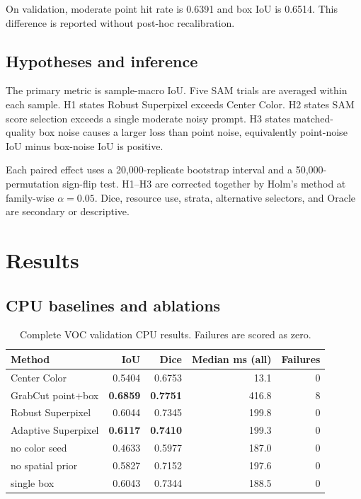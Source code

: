 On validation, moderate point hit rate is 0.6391 and box IoU is 0.6514. This difference is reported without post-hoc recalibration.

\subsection{Hypotheses and inference}
The primary metric is sample-macro IoU. Five SAM trials are averaged within each sample. H1 states Robust Superpixel exceeds Center Color. H2 states SAM score selection exceeds a single moderate noisy prompt. H3 states matched-quality box noise causes a larger loss than point noise, equivalently point-noise IoU minus box-noise IoU is positive.

Each paired effect uses a 20,000-replicate bootstrap interval and a 50,000-permutation sign-flip test. H1--H3 are corrected together by Holm's method at family-wise $\alpha=0.05$. Dice, resource use, strata, alternative selectors, and Oracle are secondary or descriptive.

\section{Results}

\subsection{CPU baselines and ablations}

\begin{table}[ht]
\centering
\caption{Complete VOC validation CPU results. Failures are scored as zero.}
\begin{tabular}{lrrrr}
\toprule
Method & IoU & Dice & Median ms (all) & Failures \\
\midrule
Center Color & 0.5404 & 0.6753 & 13.1 & 0 \\
GrabCut point+box & \textbf{0.6859} & \textbf{0.7751} & 416.8 & 8 \\
Robust Superpixel & 0.6044 & 0.7345 & 199.8 & 0 \\
Adaptive Superpixel & \textbf{0.6117} & \textbf{0.7410} & 199.3 & 0 \\
\quad no color seed & 0.4633 & 0.5977 & 187.0 & 0 \\
\quad no spatial prior & 0.5827 & 0.7152 & 197.6 & 0 \\
\quad single box & 0.6043 & 0.7344 & 188.5 & 0 \\
\bottomrule
\end{tabular}
\end{table}

